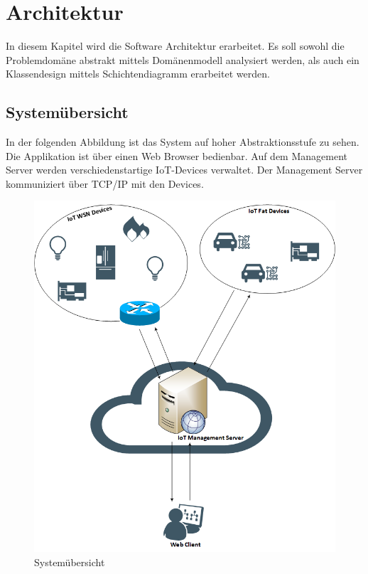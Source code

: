 \chapter{Architektur}
In diesem Kapitel wird die Software Architektur erarbeitet.  
Es soll sowohl die Problemdomäne abstrakt mittels Domänenmodell analysiert werden, als auch ein Klassendesign mittels Schichtendiagramm erarbeitet werden.

\section{Systemübersicht}
In der folgenden Abbildung ist das System auf hoher Abstraktionsstufe zu sehen. Die Applikation ist über einen Web Browser bedienbar. Auf dem Management Server werden verschiedenstartige IoT-Devices verwaltet. Der Management Server kommuniziert über TCP/IP mit den Devices. 

\begin{figure}[H]
\center
\includegraphics[scale=0.6]{../03_Design/images/systemuebersicht.png}\caption{Systemübersicht}
\end{figure}

\newpage


